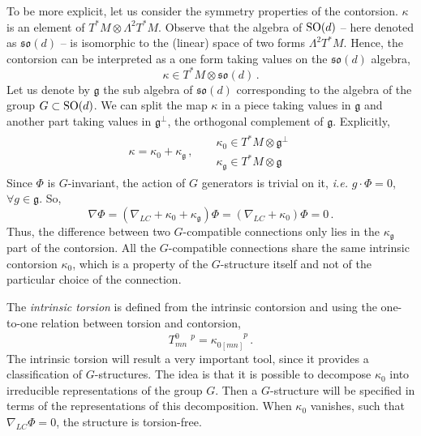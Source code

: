 \documentclass[debug]{phd}
\begin{document}
						To be more explicit, let us consider the symmetry properties of the contorsion.
						$\kappa$ is an element of $T^*M \otimes \Lambda^2 T^*M$.
						Observe that the algebra of $\mathrm{SO}(d)$ -- here denoted as $\mathfrak{so}(d)$ -- is isomorphic to the (linear) space of two forms $\Lambda^2 T^*M$.
						Hence, the contorsion can be interpreted as a one form taking values on the $\mathfrak{so}(d)$ algebra,
								\begin{equation}
									\kappa \in T^*M \otimes \mathfrak{so}(d)\, .
								\end{equation}
						Let us denote by $\mathfrak{g}$ the sub algebra of $\mathfrak{so}(d)$ corresponding to the algebra of the group $G \subset \mathrm{SO}(d)$.
						We can split the map $\kappa$ in a piece taking values in $\mathfrak{g}$ and another part taking values in $\mathfrak{g}^{\perp}$, the orthogonal complement of $\mathfrak{g}$.
						Explicitly,
								\begin{align}\label{decomk}
								&&	\kappa = \kappa_0 + \kappa_\mathfrak{g}\, , & & 	\begin{array}{l}
																				\kappa_0 			\in T^*M \otimes \mathfrak{g}^\perp \\[1mm]
																				\kappa_\mathfrak{g} \in T^*M \otimes \mathfrak{g}
																			\end{array}	&&
								\end{align}
						Since $\Phi$ is $G$-invariant, the action of $G$ generators is trivial on it, \emph{i.e.} $g \cdot \Phi = 0$, $\forall g \in \mathfrak{g}$.
						So,
								\begin{equation}
									\nabla \Phi = (\nabla_{LC} + \kappa_0 + \kappa_{\mathfrak{g}}) \Phi =  (\nabla_{LC} + \kappa_0) \Phi  = 0\, .
								\end{equation}
						Thus, the difference between two $G$-compatible connections only lies in the $\kappa_{\mathfrak{g}}$ part of the contorsion.
						All the $G$-compatible connections share the same intrinsic contorsion $\kappa_0$, which is a property of the $G$-structure itself and not of the particular choice of the connection.
						
						The \emph{intrinsic torsion} is defined from the intrinsic contorsion and using the one-to-one relation between torsion and contorsion,
								\begin{equation}
									T^{0\phantom{mn}p}_{mn} = \kappa_{0[mn]}^{\phantom{0[mn]}p} \, .
								\end{equation}
						The intrinsic torsion will result a very important tool, since it provides a classification of $G$-structures.
						The idea is that it is possible to decompose $\kappa_0$ into irreducible representations of the group $G$.
						Then a $G$-structure will be specified in terms of the representations of this decomposition.
						When $\kappa_0$ vanishes, such that $\nabla_{LC}\Phi = 0$, the structure is torsion-free.
\end{document}
